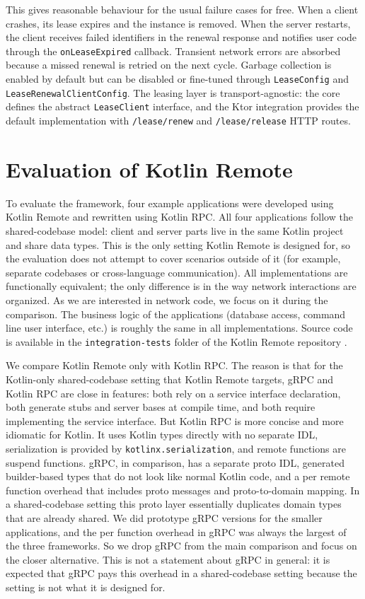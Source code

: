 \documentclass[a4paper,11pt,oneside]{article}
\newcommand{\kotlini}[1]{\texttt{#1}}
\newcommand{\ki}[1]{\kotlini{#1}}
\begin{document}
This gives reasonable behaviour for the usual failure cases for free. When a client crashes, its
lease expires and the instance is removed. When the server restarts, the client receives
failed identifiers in the renewal response and notifies user code through the \ki{onLeaseExpired}
callback. Transient network errors are absorbed because a missed renewal is retried on the next
cycle. Garbage collection is enabled by default but can be disabled or fine-tuned through
\ki{LeaseConfig} and \ki{LeaseRenewalClientConfig}. The leasing layer is transport-agnostic: the core
defines the abstract \ki{LeaseClient} interface, and the Ktor integration provides the default implementation
with \ki{/lease/renew} and \ki{/lease/release} HTTP routes.

\section{Evaluation of Kotlin Remote}

To evaluate the framework, four example applications were developed using Kotlin Remote and
rewritten using Kotlin RPC. All four applications follow the shared-codebase model: client and server
parts live in the same Kotlin project and share data types. This is the only setting Kotlin Remote
is designed for, so the evaluation does not attempt to cover scenarios outside of it (for example,
separate codebases or cross-language communication). All implementations are functionally equivalent;
the only difference is in the way network interactions are organized. As we are interested in
network code, we focus on it during the comparison. The business logic of the applications (database
access, command line user interface, etc.) is roughly the same in all implementations. Source code
is available in the \texttt{integration-tests} folder of the Kotlin Remote repository \cite{enotvtapke_kotlin-remote_2026}.

We compare Kotlin Remote only with Kotlin RPC. The reason is that for the Kotlin-only shared-codebase
setting that Kotlin Remote targets, gRPC and Kotlin RPC are close in
features: both rely on a service interface declaration, both generate stubs and server bases at
compile time, and both require implementing the service interface. But Kotlin RPC is more concise
and more idiomatic for Kotlin. It uses Kotlin types directly with no separate IDL, serialization
is provided by \texttt{kotlinx.serialization}, and remote functions are suspend functions. gRPC, in
comparison, has a separate proto IDL, generated builder-based types that do not look like normal
Kotlin code, and a per remote function overhead that includes proto messages and proto-to-domain
mapping. In a shared-codebase setting this proto layer essentially duplicates domain types that
are already shared. We did prototype gRPC versions for the smaller applications, and the per
function overhead in gRPC was always the largest of the three frameworks. So we drop gRPC from
the main comparison and focus on the closer alternative. This is not a statement about gRPC in
general: it is expected that gRPC pays this overhead in a shared-codebase setting because the
setting is not what it is designed for.
\end{document}
